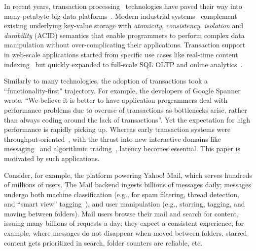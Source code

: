 In recent years, transaction processing~\cite{Gray:1992:TPC:573304} technologies have paved their way into many-petabyte big data 
platforms~\cite{Percolator2010,Spanner2012,Omid2017}. 
Modern industrial  systems~\cite{Percolator2010,Omid2017,tephra,cockroach} complement 
existing underlying key-value storage with {\em atomicity}, {\em consistency}, {\em isolation\/} and 
{\em durability} (ACID) semantics that enable programmers to perform 
complex data manipulation without over-complicating their applications. Transaction support 
in web-scale applications started from specific use cases like real-time content indexing~\cite{Percolator2010,
Omid2017} but quickly expanded to 
full-scale SQL OLTP and online analytics~\cite{Phoenix, F1-2013}.

Similarly to many technologies, the adoption of transactions took a  ``functionality-first" trajectory. 
For example, the developers of Google Spanner~\cite{Spanner2012} wrote: ``We believe it
is better to have application programmers deal with performance problems due to overuse 
of transactions as bottlenecks arise, rather than always coding around the lack of transactions''. 
Yet the expectation for high performance is rapidly picking up. %
Whereas early 
transaction systems were throughput-oriented~\cite{Percolator2010, Omid2017}, 
with the thrust into new interactive domains like messaging~\cite{Borthakur:2011} and algorithmic 
trading~\cite{opentsdb}, latency becomes essential. This paper is motivated by such  applications.

Consider, for example, the platform powering Yahoo! Mail, which serves hundreds of millions of users. 
The Mail backend ingests billions of messages daily; messages undergo both machine 
classification (e.g., for spam filtering, thread detection, and ``smart view'' tagging~\cite{smart-view}),
and user manipulation (e.g., starring, tagging, and moving between folders).    
Mail users browse their mail and search for content, issuing many billions of requests a day; they
expect a consistent experience, for example, where messages  do not 
disappear when moved between folders, starred content gets prioritized in search, folder counters are reliable, etc.

